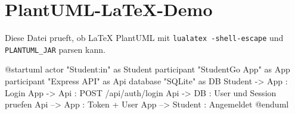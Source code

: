 \documentclass{article}
\begin{document}
\section*{PlantUML-LaTeX-Demo}
Diese Datei prueft, ob LaTeX PlantUML mit \texttt{lualatex -shell-escape} und \texttt{PLANTUML\_JAR} parsen kann.

\begin{plantuml}
@startuml
actor "Student:in" as Student
participant "StudentGo App" as App
participant "Express API" as Api
database "SQLite" as DB
Student -> App : Login
App -> Api : POST /api/auth/login
Api -> DB : User und Session pruefen
Api --> App : Token + User
App --> Student : Angemeldet
@enduml
\end{plantuml}
\end{document}
